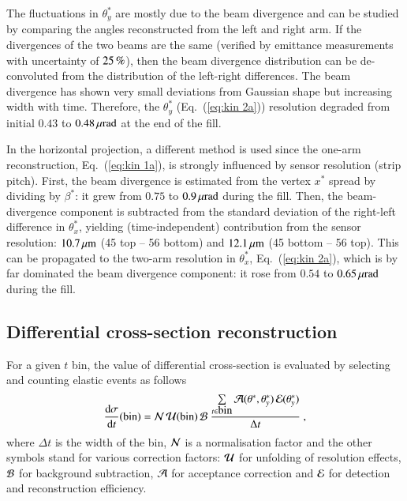 The fluctuations in $\theta_y^*$ are mostly due to the beam divergence and can be studied by comparing the angles reconstructed from the left and right arm. If the divergences of the two beams are the same (verified by emittance measurements with uncertainty of $25\,{\rm \%}$), then the beam divergence distribution can be de-convoluted from the distribution of the left-right differences. The beam divergence has shown very small deviations from Gaussian shape but increasing width with time. Therefore, the $\theta_y^*$ (Eq.~(\ref{eq:kin 2a})) resolution degraded from initial $0.43$ to $0.48\,{\rm \mu rad}$ at the end of the fill.

In the horizontal projection, a different method is used since the one-arm reconstruction, Eq.~(\ref{eq:kin 1a}), is strongly influenced by sensor resolution (strip pitch). First, the beam divergence is estimated from the vertex $x^*$ spread by dividing by $\beta^*$: it grew from $0.75$ to $0.9\,{\rm \mu rad}$ during the fill. Then, the beam-divergence component is subtracted from the standard deviation of the right-left difference in $\theta_x^*$, yielding (time-independent) contribution from the sensor resolution: $10.7\,{\rm \mu m}$ (45 top -- 56 bottom) and $12.1\,{\rm \mu m}$ (45 bottom -- 56 top). This can be propagated to the two-arm resolution in $\theta_x^*$, Eq.~({\ref{eq:kin 2a}}), which is by far dominated the beam divergence component: it rose from $0.54$ to $0.65\,{\rm \mu rad}$ during the fill. 


\subsection{Differential cross-section reconstruction}
\label{sec:diff cs}

For a given $t$ bin, the value of differential cross-section is evaluated by selecting and counting elastic events as follows
\begin{equation}
{\d\sigma\over \d t}(\hbox{bin}) =
	{\cal N}\, {\cal U}({\rm bin})\, {\cal B}\ 
	{\sum\limits_{t \in \hbox{bin}} {\cal A}(\theta^*, \theta_y^*)\, {\cal E}(\theta_y^*)\over \Delta t}\ ,
\end{equation}
where $\Delta t$ is the width of the bin, ${\cal N}$ is a normalisation factor and the other symbols stand for various correction factors:
 ${\cal U}$ for unfolding of resolution effects, ${\cal B}$ for background subtraction, ${\cal A}$ for acceptance correction and ${\cal E}$ for detection and reconstruction efficiency.

